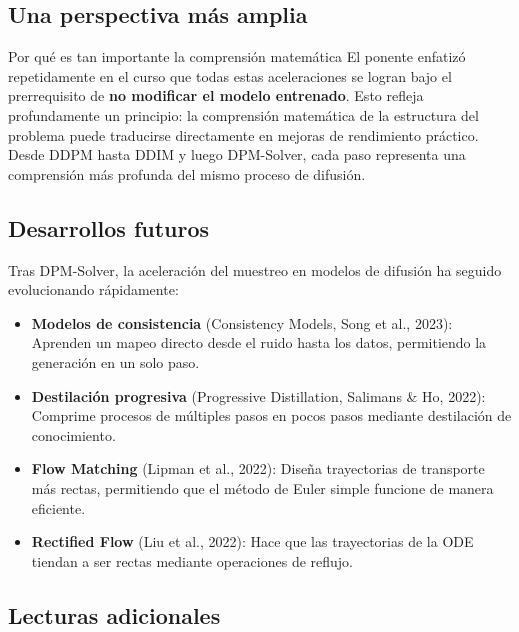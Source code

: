 \documentclass[a4paper]{article}
\begin{document}
\subsection{Una perspectiva más amplia}

\begin{knowledgebox}{Por qué es tan importante la comprensión matemática}
El ponente enfatizó repetidamente en el curso que todas estas aceleraciones se logran bajo el prerrequisito de \textbf{no modificar el modelo entrenado}. Esto refleja profundamente un principio: la comprensión matemática de la estructura del problema puede traducirse directamente en mejoras de rendimiento práctico. Desde DDPM hasta DDIM y luego DPM-Solver, cada paso representa una comprensión más profunda del mismo proceso de difusión.
\end{knowledgebox}

\subsection{Desarrollos futuros}

Tras DPM-Solver, la aceleración del muestreo en modelos de difusión ha seguido evolucionando rápidamente:

\begin{itemize}
    \item \textbf{Modelos de consistencia} (Consistency Models, Song et al., 2023): Aprenden un mapeo directo desde el ruido hasta los datos, permitiendo la generación en un solo paso.
    \item \textbf{Destilación progresiva} (Progressive Distillation, Salimans \& Ho, 2022): Comprime procesos de múltiples pasos en pocos pasos mediante destilación de conocimiento.
    \item \textbf{Flow Matching} (Lipman et al., 2022): Diseña trayectorias de transporte más rectas, permitiendo que el método de Euler simple funcione de manera eficiente.
    \item \textbf{Rectified Flow} (Liu et al., 2022): Hace que las trayectorias de la ODE tiendan a ser rectas mediante operaciones de reflujo.
\end{itemize}

\subsection{Lecturas adicionales}
\end{document}
